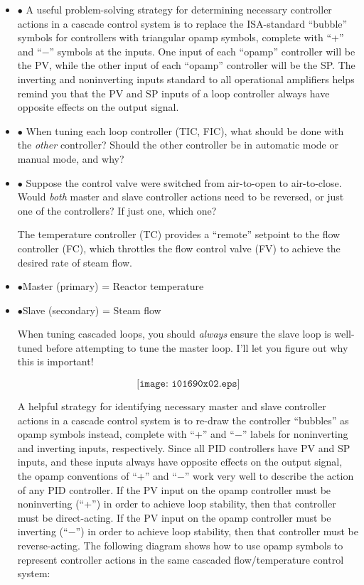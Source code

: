 \begin{itemize}
\item{$\bullet$} A useful problem-solving strategy for determining necessary controller actions in a cascade control system is to replace the ISA-standard ``bubble'' symbols for controllers with triangular opamp symbols, complete with ``+'' and ``$-$'' symbols at the inputs.  One input of each ``opamp'' controller will be the PV, while the other input of each ``opamp'' controller will be the SP.  The inverting and noninverting inputs standard to all operational amplifiers helps remind you that the PV and SP inputs of a loop controller always have opposite effects on the output signal.
\item{$\bullet$} When tuning each loop controller (TIC, FIC), what should be done with the {\it other} controller?  Should the other controller be in automatic mode or manual mode, and why?
\item{$\bullet$} Suppose the control valve were switched from air-to-open to air-to-close.  Would {\it both} master and slave controller actions need to be reversed, or just one of the controllers?  If just one, which one?
\medskip







The temperature controller (TC) provides a ``remote'' setpoint to the flow controller (FC), which throttles the flow control valve (FV) to achieve the desired rate of steam flow.  

\medskip 
\item{$\bullet$}Master (primary) = Reactor temperature
\item{$\bullet$}Slave (secondary) = Steam flow
\medskip 

When tuning cascaded loops, you should {\it always} ensure the slave loop is well-tuned before attempting to tune the master loop.  I'll let you figure out why this is important!

\vskip 10pt

$$\texttt{[image: i01690x02.eps]}$$

\vskip 10pt

\filbreak

A helpful strategy for identifying necessary master and slave controller actions in a cascade control system is to re-draw the controller ``bubbles'' as opamp symbols instead, complete with ``+'' and ``$-$'' labels for noninverting and inverting inputs, respectively.  Since all PID controllers have PV and SP inputs, and these inputs always have opposite effects on the output signal, the opamp conventions of ``+'' and ``$-$'' work very well to describe the action of any PID controller.  If the PV input on the opamp controller must be noninverting (``+'') in order to achieve loop stability, then that controller must be direct-acting.  If the PV input on the opamp controller must be inverting (``$-$'') in order to achieve loop stability, then that controller must be reverse-acting.  The following diagram shows how to use opamp symbols to represent controller actions in the same cascaded flow/temperature control system:


\end{itemize}
